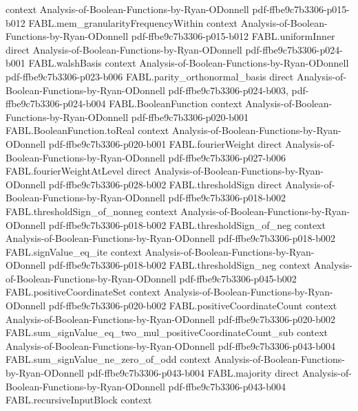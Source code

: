 \begin{theorem}
  {context}
  {Analysis-of-Boolean-Functions-by-Ryan-ODonnell}
  {pdf-ffbe9c7b3306-p015-b012}
\proofstep
  {FABL.mem_granularityFrequencyWithin}
  {context}
  {Analysis-of-Boolean-Functions-by-Ryan-ODonnell}
  {pdf-ffbe9c7b3306-p015-b012}
\proofstep
  {FABL.uniformInner}
  {direct}
  {Analysis-of-Boolean-Functions-by-Ryan-ODonnell}
  {pdf-ffbe9c7b3306-p024-b001}
\proofstep
  {FABL.walshBasis}
  {context}
  {Analysis-of-Boolean-Functions-by-Ryan-ODonnell}
  {pdf-ffbe9c7b3306-p023-b006}
\proofstep
  {FABL.parity_orthonormal_basis}
  {direct}
  {Analysis-of-Boolean-Functions-by-Ryan-ODonnell}
  {pdf-ffbe9c7b3306-p024-b003,
    pdf-ffbe9c7b3306-p024-b004}
\proofstep
  {FABL.BooleanFunction}
  {context}
  {Analysis-of-Boolean-Functions-by-Ryan-ODonnell}
  {pdf-ffbe9c7b3306-p020-b001}
\proofstep
  {FABL.BooleanFunction.toReal}
  {context}
  {Analysis-of-Boolean-Functions-by-Ryan-ODonnell}
  {pdf-ffbe9c7b3306-p020-b001}
\proofstep
  {FABL.fourierWeight}
  {direct}
  {Analysis-of-Boolean-Functions-by-Ryan-ODonnell}
  {pdf-ffbe9c7b3306-p027-b006}
\proofstep
  {FABL.fourierWeightAtLevel}
  {direct}
  {Analysis-of-Boolean-Functions-by-Ryan-ODonnell}
  {pdf-ffbe9c7b3306-p028-b002}
\proofstep
  {FABL.thresholdSign}
  {direct}
  {Analysis-of-Boolean-Functions-by-Ryan-ODonnell}
  {pdf-ffbe9c7b3306-p018-b002}
\proofstep
  {FABL.thresholdSign_of_nonneg}
  {context}
  {Analysis-of-Boolean-Functions-by-Ryan-ODonnell}
  {pdf-ffbe9c7b3306-p018-b002}
\proofstep
  {FABL.thresholdSign_of_neg}
  {context}
  {Analysis-of-Boolean-Functions-by-Ryan-ODonnell}
  {pdf-ffbe9c7b3306-p018-b002}
\proofstep
  {FABL.signValue_eq_ite}
  {context}
  {Analysis-of-Boolean-Functions-by-Ryan-ODonnell}
  {pdf-ffbe9c7b3306-p018-b002}
\proofstep
  {FABL.thresholdSign_neg}
  {context}
  {Analysis-of-Boolean-Functions-by-Ryan-ODonnell}
  {pdf-ffbe9c7b3306-p045-b002}
\proofstep
  {FABL.positiveCoordinateSet}
  {context}
  {Analysis-of-Boolean-Functions-by-Ryan-ODonnell}
  {pdf-ffbe9c7b3306-p020-b002}
\proofstep
  {FABL.positiveCoordinateCount}
  {context}
  {Analysis-of-Boolean-Functions-by-Ryan-ODonnell}
  {pdf-ffbe9c7b3306-p020-b002}
\proofstep
  {FABL.sum_signValue_eq_two_mul_positiveCoordinateCount_sub}
  {context}
  {Analysis-of-Boolean-Functions-by-Ryan-ODonnell}
  {pdf-ffbe9c7b3306-p043-b004}
\proofstep
  {FABL.sum_signValue_ne_zero_of_odd}
  {context}
  {Analysis-of-Boolean-Functions-by-Ryan-ODonnell}
  {pdf-ffbe9c7b3306-p043-b004}
\proofstep
  {FABL.majority}
  {direct}
  {Analysis-of-Boolean-Functions-by-Ryan-ODonnell}
  {pdf-ffbe9c7b3306-p043-b004}
\proofstep
  {FABL.recursiveInputBlock}
  {context}

\end{theorem}
